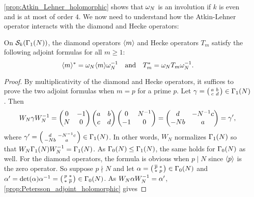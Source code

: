     \cref{prop:Atkin_Lehner_holomorphic} shows that $\omega_{N}$ is an involution if $k$ is even and is at most of order $4$. We now need to understand how the Atkin-Lehner operator interacts with the diamond and Hecke operators:

    \begin{proposition}\label{prop:Atkin_Lehner_adjoint_diamond_Hecke_holomorphic}
      On $\mathcal{S}_{k}(\Gamma_{1}(N))$, the diamond operators $\langle m\rangle$ and Hecke operators $T_{m}$ satisfy the following adjoint formulas for all $m \ge 1$:
      \[
        \langle m\rangle^{\ast} = \omega_{N}\langle m\rangle\omega_{N}^{-1} \quad \text{and} \quad T_{m}^{\ast} = \omega_{N}T_{m}\omega_{N}^{-1}.
      \]
    \end{proposition}
    \begin{proof}
      By multiplicativity of the diamond and Hecke operators, it suffices to prove the two adjoint formulas when $m = p$ for a prime $p$. Let $\gamma = \begin{psmallmatrix} a & b \\ c & d \end{psmallmatrix} \in \Gamma_{1}(N)$. Then
      \[
        W_{N}\gamma W_{N}^{-1} = \begin{pmatrix} 0 & -1 \\ N & 0 \end{pmatrix}\begin{pmatrix} a & b \\ c & d \end{pmatrix}\begin{pmatrix} 0 & N^{-1} \\ -1 & 0 \end{pmatrix} = \begin{pmatrix} d & -N^{-1}c \\ -Nb & a \end{pmatrix} = \gamma',
      \]
      where $\gamma' = \begin{psmallmatrix} d & -N^{-1}c \\ -Nb & a \end{psmallmatrix} \in \Gamma_{1}(N)$. In other words, $W_{N}$ normalizes $\Gamma_{1}(N)$ so that $W_{N}\Gamma_{1}(N)W_{N}^{-1} = \Gamma_{1}(N)$. As $\Gamma_{0}(N) \le \Gamma_{1}(N)$, the same holds for $\Gamma_{0}(N)$ as well. For the diamond operators, the formula is obvious when $p \mid N$ since $\langle p\rangle$ is the zero operator. So suppose $p \nmid N$ and let $\alpha = \begin{psmallmatrix} \overline{p} & \ast \\ \ast & p \end{psmallmatrix} \in \Gamma_{0}(N)$ and $\alpha' = \det(\alpha)\alpha^{-1} = \begin{psmallmatrix} p & \ast \\ \ast & \overline{p} \end{psmallmatrix} \in \Gamma_{0}(N)$. As $W_{N}\alpha W_{N}^{-1} = \alpha'$, \cref{prop:Petersson_adjoint_holomorphic} gives

\end{proof}
